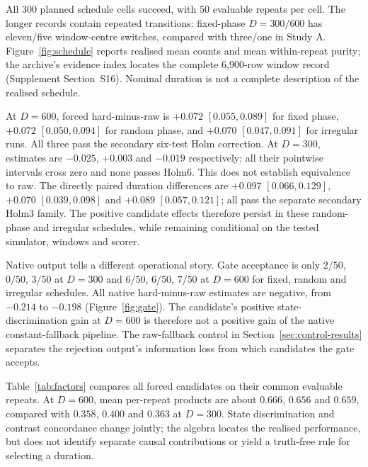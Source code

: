 All $300$ planned schedule cells succeed, with $50$ evaluable repeats
per cell. The longer records contain repeated transitions: fixed-phase
$D=300/600$ has eleven/five window-centre switches, compared with three/one
in Study A. Figure~\ref{fig:schedule} reports realised mean counts and mean
within-repeat purity; the archive's evidence index locates the complete
6,900-row window record (Supplement Section~S16).
Nominal duration is not a complete description of the realised schedule.

At $D=600$, forced hard-minus-raw is $+0.072$ $[0.055,0.089]$ for fixed phase,
$+0.072$ $[0.050,0.094]$ for random phase, and $+0.070$ $[0.047,0.091]$
for irregular runs. All three pass the secondary six-test Holm correction.
At $D=300$, estimates are $-0.025$, $+0.003$ and $-0.019$ respectively;
all their pointwise intervals cross zero and none passes Holm6. This does not
establish equivalence to raw. The directly paired duration differences are
$+0.097$ $[0.066,0.129]$, $+0.070$ $[0.039,0.098]$ and
$+0.089$ $[0.057,0.121]$; all pass the separate secondary Holm3 family.
The positive candidate effects therefore persist in these random-phase and
irregular schedules, while remaining conditional on the tested simulator,
windows and scorer.

Native output tells a different operational story. Gate acceptance is only
$2/50$, $0/50$, $3/50$ at $D=300$ and $6/50$, $6/50$, $7/50$ at $D=600$
for fixed, random and irregular schedules. All native hard-minus-raw estimates
are negative, from $-0.214$ to $-0.198$ (Figure~\ref{fig:gate}).
The candidate's positive state-discrimination gain at $D=600$ is therefore
not a positive gain of the native constant-fallback pipeline. The raw-fallback
control in Section~\ref{sec:control-results} separates the rejection output's
information loss from which candidates the gate accepts.

Table~\ref{tab:factors} compares all forced candidates on their common
evaluable repeats. At $D=600$, mean per-repeat products are about
$0.666$, $0.656$ and $0.659$, compared with $0.358$, $0.400$ and $0.363$
at $D=300$. State discrimination and contrast concordance change jointly;
the algebra locates the realised performance, but does not identify separate
causal contributions or yield a truth-free rule for selecting a duration.
